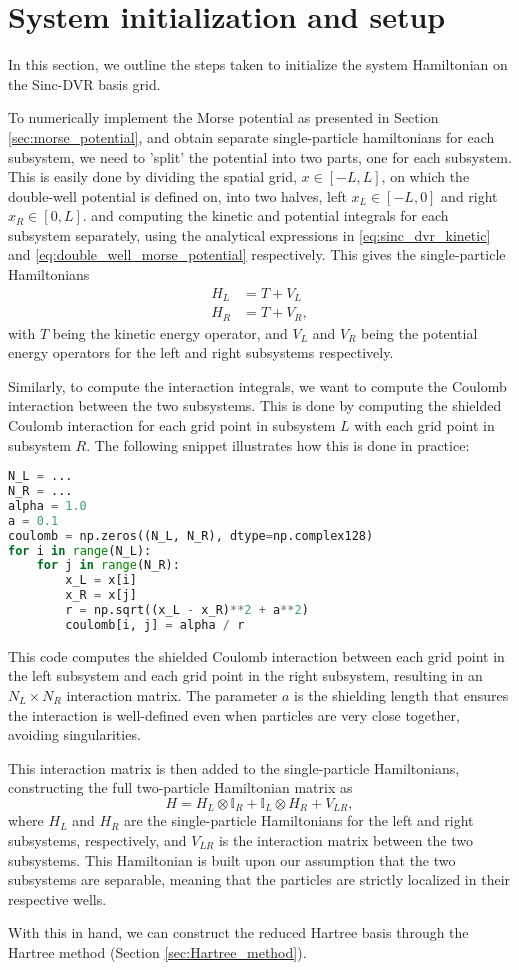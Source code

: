 \documentclass{subfiles}
\begin{document}
\section{System initialization and setup}\label{sec:system_init}
In this section, we outline the steps taken to initialize the system Hamiltonian on the Sinc-DVR basis grid.

To numerically implement the Morse potential as presented in Section \ref{sec:morse_potential}, and obtain separate single-particle hamiltonians for each subsystem, we need to 'split' the potential into two parts, one for each subsystem. This is easily done by dividing the spatial grid, $x\in[-L, L]$, on which the double-well potential is defined on, into two halves, left $x_L\in[-L, 0]$ and right $x_R\in[0, L]$. and computing the kinetic and potential integrals for each subsystem separately, using the analytical expressions in \eqref{eq:sinc_dvr_kinetic} and \eqref{eq:double_well_morse_potential} respectively. This gives the single-particle Hamiltonians 
\begin{align*}
    H_L &= T + V_L \\
    H_R &= T + V_R,
\end{align*}
with $T$ being the kinetic energy operator, and $V_L$ and $V_R$ being the potential energy operators for the left and right subsystems respectively. 

Similarly, to compute the interaction integrals, we want to compute the Coulomb interaction between the two subsystems. This is done by computing the shielded Coulomb interaction for each grid point in subsystem $L$ with each grid point in subsystem $R$. The following snippet illustrates how this is done in practice:
\begin{lstlisting}[language=Python]
N_L = ...
N_R = ...
alpha = 1.0
a = 0.1
coulomb = np.zeros((N_L, N_R), dtype=np.complex128)
for i in range(N_L):
    for j in range(N_R):
        x_L = x[i]
        x_R = x[j]
        r = np.sqrt((x_L - x_R)**2 + a**2)
        coulomb[i, j] = alpha / r
\end{lstlisting}
This code computes the shielded Coulomb interaction between each grid point in the left subsystem and each grid point in the right subsystem, resulting in an $N_L \times N_R$ interaction matrix. The parameter $a$ is the shielding length that ensures the interaction is well-defined even when particles are very close together, avoiding singularities.

This interaction matrix is then added to the single-particle Hamiltonians, constructing the full two-particle Hamiltonian matrix as
\begin{equation}
    H = H_L \otimes \mathbb{I}_R + \mathbb{I}_L \otimes H_R + V_{LR},\label{eq:two_particle_hamiltonian}
\end{equation}
where $H_L$ and $H_R$ are the single-particle Hamiltonians for the left and right subsystems, respectively, and $V_{LR}$ is the interaction matrix between the two subsystems. This Hamiltonian is built upon our assumption that the two subsystems are separable, meaning that the particles are strictly localized in their respective wells.

With this in hand, we can construct the reduced Hartree basis through the Hartree method (Section \ref{sec:Hartree_method}).
\end{document}
